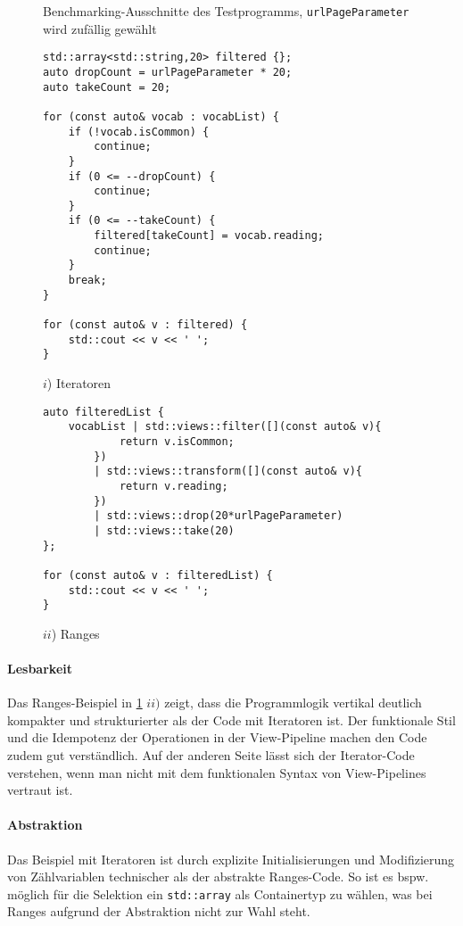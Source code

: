 \documentclass[runningheads]{llncs}
\begin{document}
\begin{figure}
	\vspace{-1em}
	\caption{Benchmarking-Ausschnitte des Testprogramms, \texttt{urlPageParameter} wird zufällig gewählt}
	\label{code:benchmark-ranges}
	\begin{minipage}{0.475\textwidth}
		\begin{lstlisting}[basicstyle={\ttfamily\tiny}]
std::array<std::string,20> filtered {};
auto dropCount = urlPageParameter * 20;
auto takeCount = 20;

for (const auto& vocab : vocabList) {
    if (!vocab.isCommon) {
        continue;
    }
    if (0 <= --dropCount) {
        continue;
    }
    if (0 <= --takeCount) {
        filtered[takeCount] = vocab.reading;
        continue;
    }
    break;
}

for (const auto& v : filtered) {
    std::cout << v << ' ';
} \end{lstlisting}
		\caption*{$i$) Iteratoren}
	\end{minipage}
	\begin{minipage}{0.475\textwidth}
		\begin{lstlisting}[basicstyle={\ttfamily\tiny}]
auto filteredList {
    vocabList | std::views::filter([](const auto& v){
			return v.isCommon;
		})
        | std::views::transform([](const auto& v){
			return v.reading;
		})
        | std::views::drop(20*urlPageParameter)
        | std::views::take(20)
};

for (const auto& v : filteredList) {
    std::cout << v << ' ';
}
\end{lstlisting}
		\caption*{$ii$) Ranges}
	\end{minipage}
	\vspace{-2em}
\end{figure}

\paragraph{Lesbarkeit}
Das Ranges-Beispiel in \ref{code:benchmark-ranges} $ii)$ zeigt, dass die Programmlogik vertikal deutlich kompakter und strukturierter als der Code mit Iteratoren ist.
Der funktionale Stil und die Idempotenz der Operationen in der View-Pipeline machen den Code zudem gut verständlich.
Auf der anderen Seite lässt sich der Iterator-Code verstehen, wenn man nicht mit dem funktionalen Syntax von View-Pipelines vertraut ist.

\paragraph{Abstraktion}
Das Beispiel mit Iteratoren ist durch explizite Initialisierungen und Modifizierung von Zählvariablen technischer als der abstrakte Ranges-Code.
So ist es bspw. möglich für die Selektion ein \texttt{std::array} als Containertyp zu wählen, was bei Ranges aufgrund der Abstraktion nicht zur Wahl steht.
\end{document}
